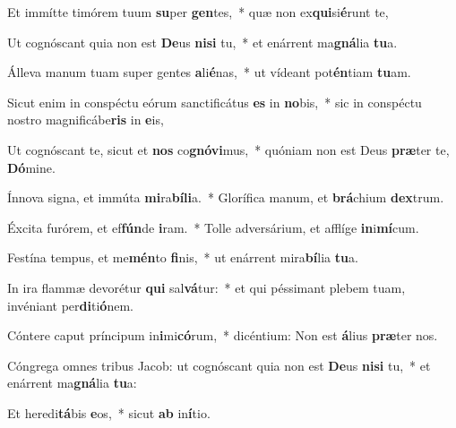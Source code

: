 \item Et immítte timórem tuum \textbf{su}per \textbf{gen}tes,~* quæ non ex\textbf{qui}si\textbf{é}runt te,
\item Ut cognóscant quia non est \textbf{De}us \textbf{ni}\textbf{si} tu,~* et enárrent ma\textbf{gná}lia \textbf{tu}a.
\item Álleva manum tuam super gentes \textbf{a}li\textbf{é}nas,~* ut vídeant pot\textbf{én}tiam \textbf{tu}am.
\item Sicut enim in conspéctu eórum sanctificátus \textbf{es} in \textbf{no}bis,~* sic in conspéctu nostro magnificábe\textbf{ris} in \textbf{e}is,
\item Ut cognóscant te, sicut et \textbf{nos} co\textbf{gnó}\textbf{vi}mus,~* quóniam non est Deus \textbf{præ}ter te, \textbf{Dó}mine.
\item Ínnova signa, et immúta \textbf{mi}ra\textbf{bí}\textbf{li}a.~* Glorífica manum, et \textbf{brá}chium \textbf{dex}trum.
\item Éxcita furórem, et ef\textbf{fún}de \textbf{i}ram.~* Tolle adversárium, et afflíge \textbf{in}i\textbf{mí}cum.
\item Festína tempus, et me\textbf{mén}to \textbf{fi}nis,~* ut enárrent mira\textbf{bí}lia \textbf{tu}a.
\item In ira flammæ devorétur \textbf{qui} sal\textbf{vá}tur:~* et qui péssimant plebem tuam, invéniant per\textbf{di}ti\textbf{ó}nem.
\item Cóntere caput príncipum in\textbf{i}mi\textbf{có}rum,~* dicéntium: Non est \textbf{á}lius \textbf{præ}ter nos.
\item Cóngrega omnes tribus Jacob: ut cognóscant quia non est \textbf{De}us \textbf{ni}\textbf{si} tu,~* et enárrent ma\textbf{gná}lia \textbf{tu}a:
\item Et heredi\textbf{tá}bis \textbf{e}os,~* sicut \textbf{ab} in\textbf{í}tio.
